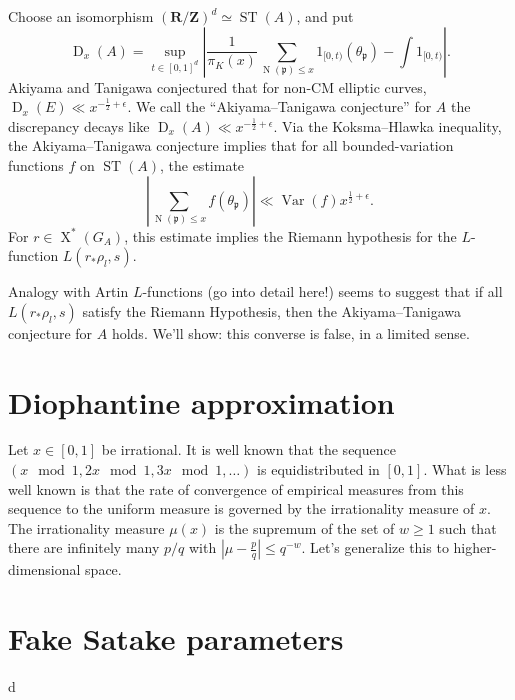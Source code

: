 \documentclass{article}
\DeclareMathOperator{\D}{D}
\DeclareMathOperator{\N}{N}
\DeclareMathOperator{\ST}{ST}
\DeclareMathOperator{\Var}{Var}
\DeclareMathOperator{\X}{X}
\newcommand{\bR}{\mathbf{R}}
\newcommand{\bZ}{\mathbf{Z}}
\newcommand{\fp}{\mathfrak{p}}
\begin{document}
Choose an isomorphism $(\bR/\bZ)^d \simeq \ST(A)$, and put 
\[
	\D_x(A) = \sup_{t\in [0,1]^d} \left| \frac{1}{\pi_K(x)} \sum_{\N(\fp) \leqslant x} 1_{[0,t)}(\theta_\fp) - \int 1_{[0,t)} \right| .
\]
Akiyama and Tanigawa conjectured that for non-CM elliptic curves, 
$\D_x(E) \ll x^{-\frac 1 2+\epsilon}$. We call the ``Akiyama--Tanigawa 
conjecture'' for $A$ the discrepancy decays like 
$\D_x(A) \ll x^{-\frac 1 2+\epsilon}$. Via the Koksma--Hlawka inequality, the 
Akiyama--Tanigawa conjecture implies that for all bounded-variation functions 
$f$ on $\ST(A)$, the estimate 
\[
	\left| \sum_{\N(\fp) \leqslant x} f(\theta_\fp)\right| \ll \Var(f)x^{\frac 1 2+\epsilon} .
\]
For $r\in \X^\ast(G_A)$, this estimate implies the Riemann hypothesis for the 
$L$-function $L(r_\ast \rho_l,s)$. 

Analogy with Artin $L$-functions (go into detail here!) seems to suggest that 
if all $L(r_\ast \rho_l,s)$ satisfy the Riemann Hypothesis, then the 
Akiyama--Tanigawa conjecture for $A$ holds. We'll show: this converse is false, 
in a limited sense. 





\section{Diophantine approximation}

Let $x\in [0,1]$ be irrational. It is well known that the sequence 
$(x\mod 1,2 x\mod 1,3 x\mod 1,\dots)$ is equidistributed in $[0,1]$. What is 
less well known is that the rate of convergence of empirical measures from this 
sequence to the uniform measure is governed by the irrationality measure of 
$x$. The irrationality measure $\mu(x)$ is the supremum of the set of 
$w\geqslant 1$ such that there are infinitely many $p/q$ with 
$\left| \mu - \frac p q\right| \leqslant q^{-w}$. Let's generalize this to 
higher-dimensional space. 





\section{Fake Satake parameters}

d
\end{document}
